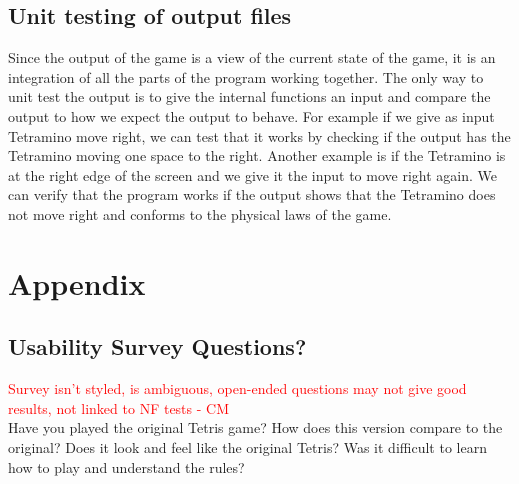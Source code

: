 \documentclass[12pt, titlepage]{article}
\begin{document}
\subsection{Unit testing of output files}	
Since the output of the game is a view of the current state of the game, it is an integration of all the parts of the program working together. The only way to unit test the output is to give the internal functions an input and compare the output to how we expect the output to behave. For example if we give as input Tetramino move right, we can test that it works by checking if the output has the Tetramino moving one space to the right. Another example is if the Tetramino is at the right edge of the screen and we give it the input to move right again. We can verify that the program works if the output shows that the Tetramino does not move right and conforms to the physical laws of the game.       	


\newpage
\section{Appendix}
\subsection{Usability Survey Questions?}
\textcolor{red}{Survey isn't styled, is ambiguous, open-ended questions may not give good results, not linked to NF tests  - CM} \\
Have you played the original Tetris game?
How does this version compare to the original?
Does it look and feel like the original Tetris?
Was it difficult to learn how to play and understand the rules?
\end{document}
